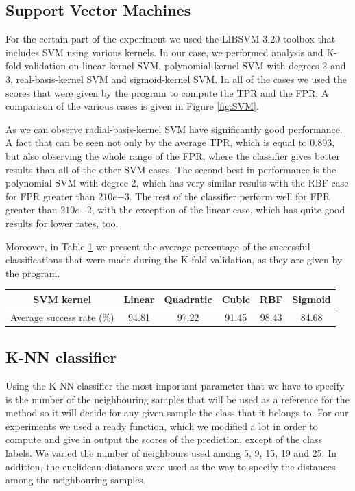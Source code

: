 \subsection{Support Vector Machines}
\noindent For the certain part of the experiment we used the LIBSVM 3.20 toolbox that includes SVM using various kernels. In our case, we performed analysis and K-fold validation on linear-kernel SVM, polynomial-kernel SVM with degrees 2 and 3, real-basis-kernel SVM and sigmoid-kernel SVM. In all of the cases we used the scores that were given by the program to compute the TPR and the FPR. A comparison of the various cases is given in Figure \ref{fig:SVM}.

\noindent As we can observe radial-basis-kernel SVM have significantly good performance. A fact that can be seen not only by the average TPR, which is equal to 0.893, but also observing the whole range of the FPR, where the classifier gives better results than all of the other SVM cases. The second best in performance is the polynomial SVM with degree 2, which has very similar results with the RBF case for FPR greater than $2 10e{-3}$. The rest of the classifier perform well for FPR greater than $2 10e{-2}$, with the exception of the linear case, which has quite good results for lower rates, too.

\noindent Moreover, in Table \ref{table:SVM_success} we present the average percentage of the successful classifications that were made during the K-fold validation, as they are given by the program.

\begin{table}[h]
  \centering
  \begin{tabular}{ | c | c | c | c | c | c |}
  \hline
  SVM kernel & Linear & Quadratic & Cubic & RBF & Sigmoid \\ \hline
  Average success rate (\%) & 94.81 & 97.22 & 91.45 & 98.43 & 84.68 \\ \hline
  \end{tabular}
  \label{table:SVM_success}
\end{table}
    
\subsection{K-NN classifier}
\noindent Using the K-NN classifier the most important parameter that we have to specify is the number of the neighbouring samples that will be used as a reference for the method so it will decide for any given sample the class that it belongs to. For our experiments we used a ready function, which we modified a lot in order to compute and give in output the scores of the prediction, except of the class labels. We varied the number of neighbours used among 5, 9, 15, 19 and 25. In addition, the euclidean distances were used as the way to specify the distances among the neighbouring samples.


